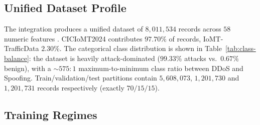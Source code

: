 \documentclass[runningheads]{llncs}
\begin{document}
\subsection{Unified Dataset Profile}

The integration produces a unified dataset of $8{,}011{,}534$ records across $58$ numeric features \cite{pantelis2026_unified_dataset}. CICIoMT2024 contributes $97.70\%$ of records, IoMT-TrafficData $2.30\%$. The categorical class distribution is shown in Table~\ref{tab:class-balance}: the dataset is heavily attack-dominated ($99.33\%$ attacks vs.\ $0.67\%$ benign), with a $\sim$$575{:}1$ maximum-to-minimum class ratio between DDoS and Spoofing. Train/validation/test partitions contain $5{,}608{,}073$, $1{,}201{,}730$ and $1{,}201{,}731$ records respectively (exactly $70/15/15$).

\begin{table}[H]
\centering
\caption{Categorical class distribution with per-source contribution in the unified dataset.}\label{tab:class-balance}
\small
{}
\end{table}

\subsection{Training Regimes}
\end{document}
